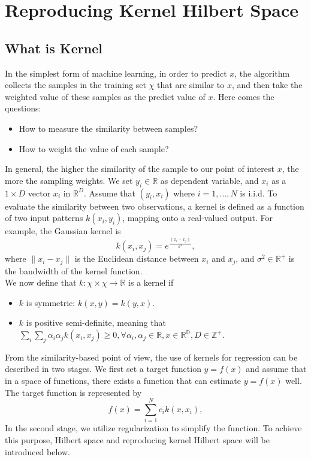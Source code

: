 \section{Reproducing Kernel Hilbert Space} 
\subsection{What is Kernel}
In the simplest form of machine learning, in order to predict $x$, the algorithm collects the samples in the training set $\chi$ that are similar to $x$, 
and then take the weighted value of these samples as the predict value of $x$. Here comes the questions:
\begin{itemize}
    \item How to measure the similarity between samples?
    \item How to weight the value of each sample?
\end{itemize} 
In general, the higher the similarity of the sample to our point of interest $x$, the more the sampling weights. We set $y_i \in \mathbb{R}$ as dependent variable, 
and $x_i$ as a $1 \times D$ vector $x_i$ in $\mathbb{R}^D$. Assume that $(y_i, x_i)$ where $i = 1, \dots, N$ is i.i.d. To evaluate the similarity between two observations, 
a kernel is defined as a function of two input patterns $k(x_i, y_i)$, mapping onto a real-valued output. For example, the Gaussian kernel is
\begin{equation*}
    k(x_i, x_j) = e^\frac{\parallel x_i - x_j \parallel}{\sigma^2},
\end{equation*}
where $\parallel x_i - x_j \parallel$ is the Euclidean distance between $x_i$ and $x_j$, and $\sigma^2 \in \mathbb{R}^+$ is the bandwidth of the kernel function.\\
We now define that $k: \chi \times \chi \rightarrow \mathbb{R}$ is a kernel if
\begin{itemize}
    \item $k$ is symmetric: $k(x,y) = k(y,x)$.
    \item $k$ is positive semi-definite, meaning that $\sum_{i} \sum_{j} \alpha_i \alpha_j k(x_i,x_j)\geq0, \forall \alpha_i, \alpha_j \in \mathbb{R}, x \in \mathbb{R}^\mathbb{D}, D \in \mathbb{Z}^+$.
\end{itemize}
From the similarity-based point of view, the use of kernels for regression can be described in two stages. We first set a target function $y=f(x)$ and assume that in a space of functions, there exists 
a function that can estimate $y=f(x)$ well. The target function is represented by
\begin{equation*}
    f(x)= \sum_{i=1}^N c_i k(x,x_i),
\end{equation*}
In the second stage, we utilize regularization to simplify the function. To achieve this purpose, Hilbert space and reproducing kernel Hilbert space will be introduced below.

